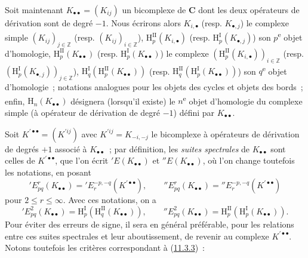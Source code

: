 \begin{env}[11.3.5]
\label{0.11.3.5-fr}
Soit maintenant $K_{\bullet\bullet}=(K_{ij})$ un bicomplexe de
$\boldsymbol{C}$ dont les deux opérateurs de dérivation sont de degré $-1$. Nous
écrirons alors $K_{i,\bullet}$ (resp. $K_{\bullet,j}$) le complexe simple
$(K_{ij})_{j\in\mathbb Z}$ (resp. $(K_{ij})_{i\in\mathbb Z}$),
$\mathrm H_p^{\mathrm{II}}(K_{i,\bullet})$ (resp.
$\mathrm H_p^{\mathrm I}(K_{\bullet,j})$) son $p$\textsuperscript{e} objet d'homologie,
$\mathrm H_p^{\mathrm{II}}(K_{\bullet\bullet})$ (resp.
$\mathrm H_p^{\mathrm I}(K_{\bullet\bullet})$) le complexe
$(\mathrm H_p^{\mathrm{II}}(K_{i,\bullet}))_{i\in\mathbb Z}$ (resp.
$(\mathrm H_p^{\mathrm I}(K_{\bullet,j}))_{j\in\mathbb Z}$),
$\mathrm H_q^{\mathrm I}(\mathrm H_p^{\mathrm{II}}(K_{\bullet\bullet}))$
(resp.
$\mathrm H_q^{\mathrm{II}}(\mathrm H_p^{\mathrm I}(K_{\bullet\bullet}))$)
son $q$\textsuperscript{e} objet d'homologie~; notations analogues pour les objets des cycles
et objets des bords~; enfin, $\mathrm H_n(K_{\bullet\bullet})$ désignera
(lorsqu'il existe) le $n$\textsuperscript{e} objet d'homologie du complexe simple (à
opérateur de dérivation de degré $-1$) défini par $K_{\bullet\bullet}$.

Soit $K^{\prime\bullet\bullet}=(K^{\prime ij})$ avec
$K^{\prime ij}=K_{-i,-j}$ le bicomplexe à opérateurs de dérivation de degrés
$+1$ associé à $K_{\bullet\bullet}$~; par définition, les
\emph{suites spectrales} de $K_{\bullet\bullet}$ sont celles de
$K^{\prime\bullet\bullet}$, que l'on écrit $'E(K_{\bullet\bullet})$ et
$''E(K_{\bullet\bullet})$, où l'on change toutefois les notations, en posant
\[
  'E_{pq}^r(K_{\bullet\bullet})
  ='E_r^{-p,-q}(K^{\prime\bullet\bullet}),\qquad
  ''E_{pq}^r(K_{\bullet\bullet})
  =''E_r^{-p,-q}(K^{\prime\bullet\bullet})
\]
pour $2\leq r\leq\infty$. Avec ces notations, on a
\[
  'E_{pq}^2(K_{\bullet\bullet})
  =\mathrm H_p^{\mathrm I}(\mathrm H_q^{\mathrm{II}}(K_{\bullet\bullet})),
  \qquad
  ''E_{pq}^2(K_{\bullet\bullet})
  =\mathrm H_p^{\mathrm{II}}(\mathrm H_p^{\mathrm I}(K_{\bullet\bullet})).
\]
Pour éviter des erreurs de signe, il sera en général préférable, pour les
relations entre ces suites spectrales et leur aboutissement, de revenir au
complexe $K^{\prime\bullet\bullet}$. Notons toutefois les critères
correspondant à (\hyperref[0.11.3.3-fr]{11.3.3})~:
\end{env}

